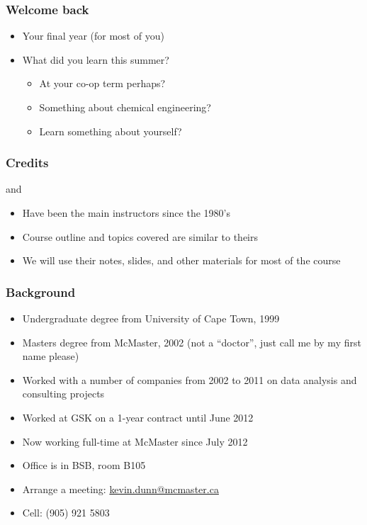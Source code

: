
\begin{frame}\frametitle{Welcome back}
	\begin{itemize}
		\item	Your final year (for most of you)
		\item	What did you learn this summer?
			\begin{itemize}
				\item	At your co-op term perhaps?
				\item	Something about chemical engineering?
				\item	Learn something about yourself?
			\end{itemize}
	\end{itemize}
\end{frame}

\begin{frame}\frametitle{Credits}
	\begin{exampleblock}{}
		\centering {\color{myOrange}{Dr. Don Woods}} and {\color{myBlue}{Dr. Thomas Marlin}}
	\end{exampleblock}
	\begin{itemize}
		\item	Have been the main instructors since the 1980's
		\item	Course outline and topics covered are similar to theirs
		\item	We will use their notes, slides, and other materials for most of the course
	\end{itemize}
\end{frame}

\begin{frame}\frametitle{Background}
	{\color{myGreen}{About myself}}
	\begin{itemize}
		\item	Undergraduate degree from University of Cape Town, 1999
		\item	Masters degree from McMaster, 2002 (not a ``doctor'', just call me by my first name please)
		\item	Worked with a number of companies from 2002 to 2011 on data analysis and consulting projects
		\item	Worked at GSK on a 1-year contract until June 2012
		\item	Now working full-time at McMaster since July 2012
		\item	Office is in BSB, room B105
		\item	Arrange a meeting: \url{kevin.dunn@mcmaster.ca}
		\item	Cell: (905) 921 5803
	\end{itemize}
\end{frame}

